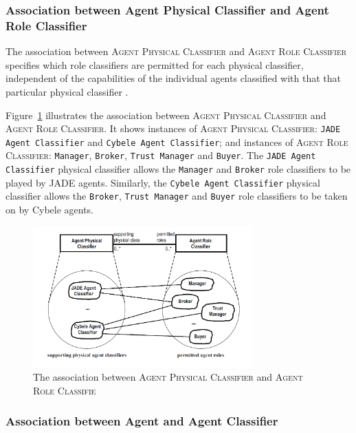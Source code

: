 \subsubsection*{Association between Agent Physical Classifier and Agent Role Classifier}

The association between \textsc{Agent Physical Classifier} and \textsc{Agent Role Classifier} specifies which role classifiers are permitted for each physical classifier, independent of the capabilities of the individual agents classified with that that particular physical classifier \cite{Odell05}.

Figure~\ref{figure:onp-physical-classifier-role-classifier-association} illustrates the association between \textsc{Agent Physical Classifier} and \textsc{Agent Role Classifier}. It shows instances of \textsc{Agent Physical Classifier}: \texttt{JADE Agent Classifier} and \texttt{Cybele Agent Classifier}; and instances of \textsc{Agent Role Classifier}: \texttt{Manager}, \texttt{Broker}, \texttt{Trust Manager} and \texttt{Buyer}.
The \texttt{JADE Agent Classifier} physical classifier allows the \texttt{Manager} and \texttt{Broker} role classifiers to be played by JADE agents.
Similarly, the \texttt{Cybele Agent Classifier} physical classifier allows the \texttt{Broker}, \texttt{Trust Manager} and \texttt{Buyer} role classifiers to be taken on by Cybele agents.

\begin{figure}[ht]
	\centering
	\includegraphics[width=0.75\textwidth]{images/onp/physical-classifier-role-classifier-association.png}
	\caption{The association between \textsc{Agent Physical Classifier} and \textsc{Agent Role Classifie}}
	\label{figure:onp-physical-classifier-role-classifier-association}
\end{figure}

\subsubsection*{Association between Agent and Agent Classifier}

